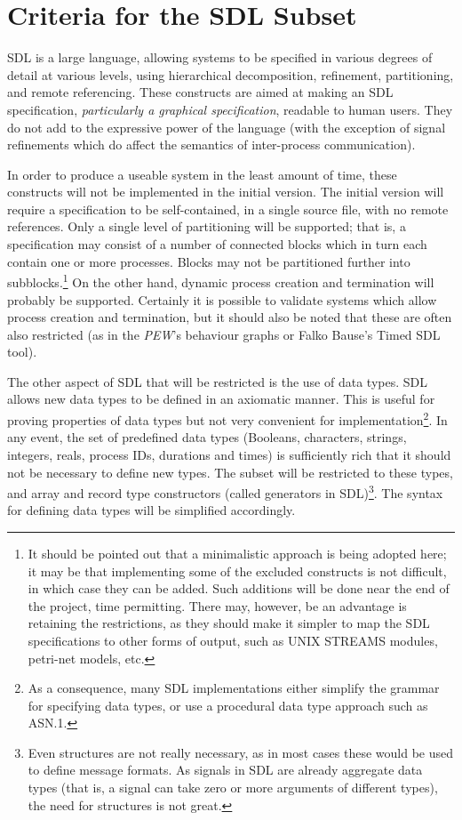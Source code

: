 \section{Criteria for the SDL Subset}

SDL is a large language, allowing systems to be specified in various
degrees of detail at various levels, using hierarchical decomposition,
refinement, partitioning, and remote referencing. These constructs are
aimed at making an SDL specification, {\em particularly a graphical
specification}, readable to human users. They do not add to the 
expressive power of the language (with the exception of signal
refinements which do affect the semantics of inter-process communication).

In order to produce a useable system in the least amount of time, these
constructs will not be implemented in the initial version. The initial
version will require a specification to be self-contained, in a single
source file, with no remote references. Only a single level of partitioning
will be supported; that is, a specification may consist of a number of
connected blocks which in turn each contain one or more processes. Blocks
may not be partitioned further into subblocks.\footnote{It should be
pointed out that a minimalistic approach is being adopted here; it may be
that implementing some of the excluded constructs is not difficult, in
which case they can be added. Such additions will be done near the
end of the project, time permitting. There may, however, be an advantage is
retaining the restrictions, as they should make it simpler to map the SDL
specifications to other forms of output, such as UNIX STREAMS modules,
petri-net models, etc.} On the other hand, dynamic process creation and
termination will probably be supported. Certainly it is possible to
validate systems which allow process creation and termination, but it
should also be noted that these are often also restricted (as in the
{\em PEW}'s behaviour graphs or Falko Bause's Timed SDL tool).

The other aspect of SDL that will be restricted is the use of data types.
SDL allows new data types to be defined in an axiomatic manner. This is
useful for proving properties of data types but not very convenient for
implementation\footnote{As a consequence, many SDL implementations
either simplify the grammar for specifying data types, or use a
procedural data type approach such as ASN.1.}.
In any event, the set of predefined data types (Booleans,
characters, strings, integers, reals, process IDs, durations and times)
is sufficiently rich that it should not be necessary to define new types.
The subset will be restricted to these types, and array and record type
constructors (called generators in SDL)\footnote{Even structures are
not really necessary, as in most cases these would be used to define
message formats. As signals in SDL are already aggregate data types
(that is, a signal can take zero or more arguments of different
types), the need for structures is not great.}.
The syntax for defining data types will be simplified accordingly.

